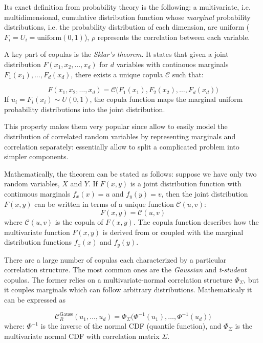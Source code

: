 Its exact definition from probability theory is the following: a multivariate, i.e. multidimensional, cumulative distribution function whose \emph{marginal} probability distributions, i.e. the probability distribution of each dimension, are uniform ($F_i = U_i =\mathrm{uniform}(0,1)$), $\rho$ represents the correlation between each variable.

A key part of copulas is the \emph{Sklar’s theorem}. It states that given a joint distribution $F(x_1, x_2, \dots, x_d)$ for $d$ variables with continouos marginals $F_1(x_1), \dots, F_d(x_d)$, there exists a unique copula $\mathcal{C}$ such that:

$$F(x_1, x_2, \dots, x_d) = \mathcal{C}\Big(F_1(x_1), F_2(x_2), \dots, F_d(x_d)\Big)$$
If $u_i = F_i(x_i) \sim U(0,1)$, the copula function maps the marginal uniform probability distributions into the joint distribution.

This property makes them very popular since allow to easily model the distribution of correlated random variables by representing marginals and correlation separately: essentially allow to split a complicated problem into simpler components.

\begin{attention}
Mathematically, the theorem can be stated as follows: suppose we have only two random variables, $X$ and $Y$. If $F(x,y)$ is a joint distribution function with continuous marginals $f_x(x)=u$ and $f_y(y)=v$, then the joint distribution $F(x,y)$ can be written in terms of a unique function $\mathcal{C}(u,v)$:
\begin{equation}
F(x,y)=\mathcal{C}(u,v)
\end{equation}
\noindent
where $\mathcal{C}(u,v)$ is the copula of $F(x,y)$.
The copula function describes how the multivariate function $F(x,y)$ is derived from or coupled with the marginal distribution functions $f_x(x)$ and $f_y(y)$.
\end{attention}

There are a large number of copulas each characterized by a particular correlation structure. The most common ones are the \emph{Gaussian} and \emph{t-student} copulas. The former relies on a multivariate-normal correlation structure $\Phi_\Sigma$, but it couples marginals which can follow arbitrary distributions.
Mathematicaly it can be expressed as

$$\mathcal{C}_R^{\text{Gauss}}(u_1, \dots, u_d) = \Phi_\Sigma \Big( \Phi^{-1}(u_1), \dots, \Phi^{-1}(u_d) \Big)$$
where: $\Phi^{-1}$ is the inverse of the normal CDF (quantile function), and $\Phi_\Sigma$ is the multivariate normal CDF with correlation matrix $\Sigma$.

